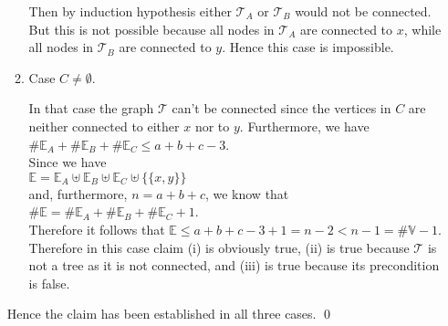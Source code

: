 \begin{enumerate}
\begin{enumerate}
    Then by induction hypothesis either $\mathcal{T}_A$ or $\mathcal{T}_B$ would not be connected.  But this is
    not possible because all nodes in $\mathcal{T}_A$ are connected to $x$, while all nodes in
    $\mathcal{T}_B$ are connected to $y$.  Hence this case is impossible.
    \green{$\surd$}
  \item Case $C \not= \emptyset$.

    In that case the graph $\mathcal{T}$ can't be connected since the vertices in $C$ are neither connected to
    either $x$ nor to $y$.  Furthermore, we have
    \\[0.2cm]
    \hspace*{1.3cm}
    $\# \mathbb{E}_A + \# \mathbb{E}_B + \# \mathbb{E}_C \leq a + b + c - 3$.
    \\[0.2cm]
    Since we have
    \\[0.2cm]
    \hspace*{1.3cm}
    $\mathbb{E} = \mathbb{E}_A \uplus \mathbb{E}_B \uplus \mathbb{E}_C \uplus \bigl\{\{x,y\}\bigr\}$
    \\[0.2cm]
    and, furthermore, $n = a + b + c$, we know that
    \\[0.2cm]
    \hspace*{1.3cm}
    $\#\mathbb{E} = \#\mathbb{E}_A + \#\mathbb{E}_B + \#\mathbb{E}_C + 1$.
    \\[0.2cm]
    Therefore it follows that $\mathbb{E} \leq a + b + c - 3 + 1 = n - 2 < n - 1 = \#\mathbb{V} - 1$.
    \\[0.2cm]
    Therefore in this case claim (i) is obviously true, (ii) is true because $\mathcal{T}$ is not a tree as
    it is not connected,
    and (iii) is true because its precondition is false.
     \green{$\surd$}
  \end{enumerate}
  Hence the claim has been established in all three cases. \qed
\end{enumerate} 

